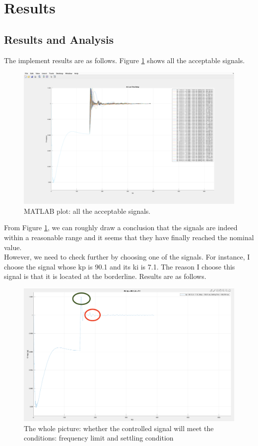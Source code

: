 \documentclass{report}
\begin{document}
\section{Results} %
\label{section4.4}
\subsection{Results and Analysis} %
The implement results are as follows. Figure \textcolor{red}{\ref{4_4_1_result1}} shows all the acceptable signals.

\begin{figure}[htbp]
\centering
\includegraphics[width = .819\textwidth]{figure/4_4_1_result1.png}
\caption{MATLAB plot: all the acceptable signals.}
\label{4_4_1_result1}
\end{figure}

From Figure \textcolor{red}{\ref{4_4_1_result1}}, we can roughly draw a conclusion that the signals are indeed within a reasonable range and it seems that they have finally reached the nominal value. \\

However, we need to check further by choosing one of the signals. For instance, I choose the signal whose kp is 90.1 and its ki is 7.1. The reason I choose this signal is that it is located at the borderline. Results are as follows. \\

\begin{figure}[htbp]
\centering
\includegraphics[width = .819\textwidth]{figure/4_4_1_result2.png}
\caption{The whole picture: whether the controlled signal will meet the conditions: frequency limit and settling condition}
\label{4_4_1_result2}
\end{figure}
\end{document}
